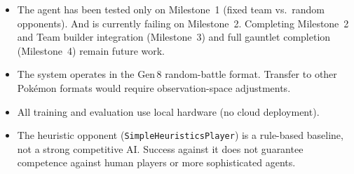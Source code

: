 \begin{itemize}
  \item The agent has been tested only on Milestone~1 (fixed team vs.\ random
        opponents). And is currently failing on Milestone~2. Completing Milestone~2 and Team builder integration (Milestone~3) and full gauntlet
        completion (Milestone~4) remain future work.
  \item The system operates in the Gen\,8 random-battle format.  Transfer to
        other Pok\'{e}mon formats would require observation-space
        adjustments.
  \item All training and evaluation use local hardware (no cloud deployment).
  \item The heuristic opponent (\texttt{SimpleHeuristicsPlayer}) is a
        rule-based baseline, not a strong competitive AI.  Success against it
        does not guarantee competence against human players or more
        sophisticated agents.
\end{itemize}
